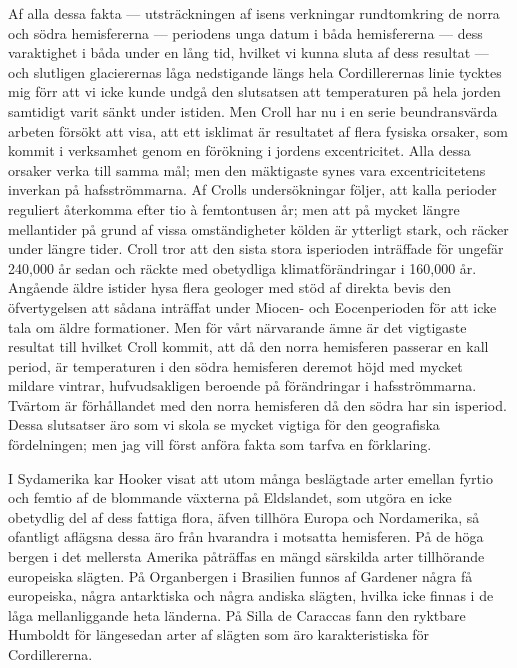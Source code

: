 Af alla dessa fakta — utsträckningen af isens verkningar rundtomkring de norra och södra hemisfererna — periodens unga datum i båda hemisfererna — dess varaktighet i båda under en lång tid, hvilket vi kunna sluta af dess resultat — och slutligen glacierernas låga nedstigande längs hela Cordillerernas linie tycktes mig förr att vi icke kunde undgå den slutsatsen att temperaturen på hela jorden samtidigt varit sänkt under istiden. Men Croll har nu i en serie beundransvärda arbeten försökt att visa, att ett isklimat är resultatet af flera fysiska orsaker, som kommit i verksamhet genom en förökning i jordens excentricitet. Alla dessa orsaker verka till samma mål; men den mäktigaste synes vara excentricitetens inverkan på hafsströmmarna. Af Crolls undersökningar följer, att kalla perioder reguliert återkomma efter tio à femtontusen år; men att på mycket längre mellantider på grund af vissa omständigheter kölden är ytterligt stark, och räcker under längre tider. Croll tror att den sista stora isperioden inträffade för ungefär 240,000 år sedan och räckte med obetydliga klimatförändringar i 160,000 år. Angående äldre istider hysa flera geologer med stöd af direkta bevis den öfvertygelsen att sådana inträffat under Miocen- och Eocenperioden för att icke tala om äldre formationer. Men för vårt närvarande ämne är det vigtigaste resultat till hvilket Croll kommit, att då den norra hemisferen passerar en kall period, är temperaturen i den södra hemisferen deremot höjd med mycket mildare vintrar, hufvudsakligen beroende på förändringar i hafsströmmarna. Tvärtom är förhållandet med den norra hemisferen då den södra har sin isperiod. Dessa slutsatser äro som vi skola se mycket vigtiga för den geografiska fördelningen; men jag vill först anföra fakta som tarfva en förklaring.

I Sydamerika kar Hooker visat att utom många beslägtade arter emellan fyrtio och femtio af de blommande växterna på Eldslandet, som utgöra en icke obetydlig del af dess fattiga flora, äfven tillhöra Europa och Nordamerika, så ofantligt aflägsna dessa äro från hvarandra i motsatta hemisferen. På de höga bergen i det mellersta Amerika påträffas en mängd särskilda arter tillhörande europeiska slägten. På Organbergen i Brasilien funnos af Gardener några få europeiska, några antarktiska och några andiska slägten, hvilka icke finnas i de låga mellanliggande heta länderna. På Silla de Caraccas fann den ryktbare Humboldt för längesedan arter af slägten som äro karakteristiska för Cordillererna.

